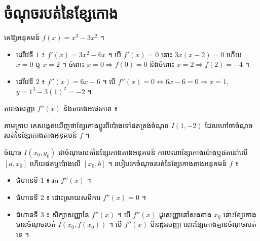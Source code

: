 \section{ចំណុចរបត់នៃខ្សែកោង}

\begin{example}[ឧទាហរណ៍]
គេឱ្យអនុគមន៍ $f(x) = x^3 - 3x^2$ ។
\begin{itemize}
  \item ដេរីវេទី $1$ ៖ $f'(x) = 3x^2 - 6x$ ។ បើ $f'(x) = 0$ នោះ $3x(x - 2) = 0$ ហើយ $x = 0$ ឬ $x = 2$ ។ ចំពោះ $x = 0 \Rightarrow f(0) = 0$ និងចំពោះ $x = 2 \Rightarrow f(2) = -4$ ។
  \item ដេរីវេទី $2$ ៖ $f''(x) = 6x - 6$ ។ បើ $f''(x) = 0 \Leftrightarrow 6x - 6 = 0 \Rightarrow x = 1$, $y = 1^3 - 3(1)^2 = -2$ ។
\end{itemize}
\end{example}
តារាងសញ្ញា $f''(x)$ និងតារាងអថេរភាព ៖
\begin{center}

\end{center}

\begin{center}
\end{center}

តាមក្រាប គេសង្កេតឃើញថាខ្សែកោងប្ដូរពីប៉ោងទៅផតត្រង់ចំណុច $I(1, -2)$ ដែលហៅថាចំណុចរបត់នៃខ្សែកោងតាងអនុគមន៍ $f$ ។

\begin{formulaBox}[ជាទូទៅ]
ចំណុច $I(x_0, y_0)$ ជាចំណុចរបត់នៃខ្សែកោងតាងអនុគមន៍ កាលណាខ្សែកោងប៉ោងឬផតនៅលើ $[a, x_0]$ ហើយផតឬប៉ោងលើ $[x_0, b]$ ។ របៀបរកចំណុចរបត់នៃខ្សែកោងតាងអនុគមន៍ $f$ ៖
\begin{itemize}
  \item ជំហានទី $1$ ៖ រក $f''(x)$ ។
  \item ជំហានទី $2$ ៖ ដោះស្រាយសមីការ $f''(x) = 0$ ។
  \item ជំហានទី $3$ ៖ សិក្សាសញ្ញានៃ $f''(x)$ ។ បើ $f''(x)$ ដូរសញ្ញានៅសងខាង $x_0$ នោះខ្សែកោងមានចំណុចរបត់ $I(x_0, f(x_0))$ ។ បើ $f''(x)$ មិនដូរសញ្ញា នោះខ្សែកោងគ្មានចំណុចរបត់ទេ ។
\end{itemize}
\end{formulaBox}

